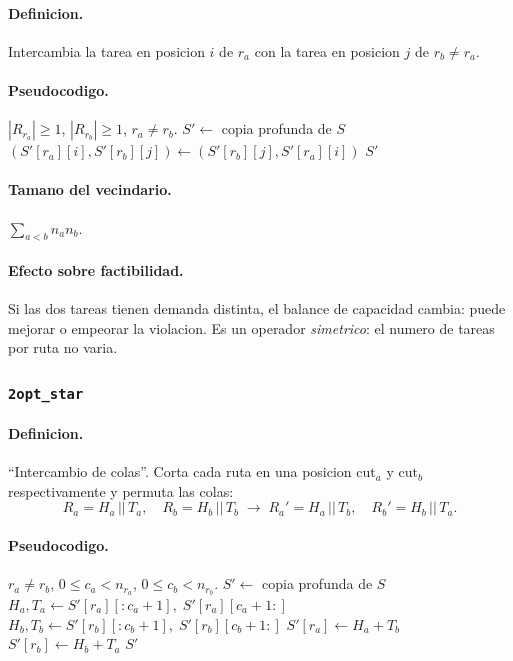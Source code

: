 \documentclass[11pt,a4paper]{article}
\newcommand{\op}[1]{\texttt{#1}}
\begin{document}
\paragraph{Definicion.} Intercambia la tarea en posicion $i$ de
$r_a$ con la tarea en posicion $j$ de $r_b\neq r_a$.

\paragraph{Pseudocodigo.}
\begin{algorithm}[H]
\caption{\op{swap\_inter}($S, r_a, i, r_b, j$)}
\begin{algorithmic}[1]
\Require $|R_{r_a}|\ge 1$, $|R_{r_b}|\ge 1$, $r_a\neq r_b$.
\State $S' \gets$ copia profunda de $S$
\State $(S'[r_a][i], S'[r_b][j]) \gets (S'[r_b][j], S'[r_a][i])$
\State \Return $S'$
\end{algorithmic}
\end{algorithm}

\paragraph{Tamano del vecindario.}
$\sum_{a<b} n_a n_b$.

\paragraph{Efecto sobre factibilidad.} Si las dos tareas tienen
demanda distinta, el balance de capacidad cambia: puede mejorar o
empeorar la violacion. Es un operador \emph{simetrico}: el numero de
tareas por ruta no varia.

\subsubsection{\op{2opt\_star}}

\paragraph{Definicion.} ``Intercambio de colas''. Corta cada ruta en
una posicion $\text{cut}_a$ y $\text{cut}_b$ respectivamente y
permuta las colas:
\[
R_a = H_a \,||\, T_a, \quad R_b = H_b \,||\, T_b
\;\longrightarrow\;
R_a' = H_a \,||\, T_b, \quad R_b' = H_b \,||\, T_a.
\]

\paragraph{Pseudocodigo.}
\begin{algorithm}[H]
\caption{\op{2opt\_star}($S, r_a, c_a, r_b, c_b$)}
\begin{algorithmic}[1]
\Require $r_a\neq r_b$, $0\le c_a < n_{r_a}$, $0\le c_b < n_{r_b}$.
\State $S' \gets$ copia profunda de $S$
\State $H_a, T_a \gets S'[r_a][:c_a{+}1],\; S'[r_a][c_a{+}1:]$
\State $H_b, T_b \gets S'[r_b][:c_b{+}1],\; S'[r_b][c_b{+}1:]$
\State $S'[r_a] \gets H_a + T_b$
\State $S'[r_b] \gets H_b + T_a$
\State \Return $S'$
\end{algorithmic}
\end{algorithm}
\end{document}
